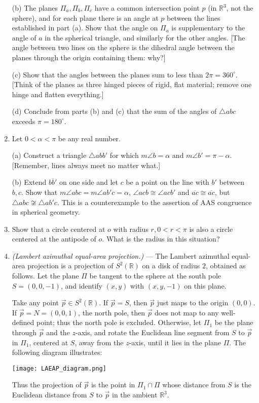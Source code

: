 \documentclass[leqno]{book}
\begin{document}
\begin{enumerate}
(b) The planes $\Pi_a,\Pi_b,\Pi_c$ have a common intersection point $p$ (in $\mathbb R^3$, not the sphere), and for each plane there is an angle at $p$ between the lines established in part (a).  Show that the angle on $\Pi_a$ is supplementary to the angle of $a$ in the spherical triangle, and similarly for the other angles.  [The angle between two lines on the sphere is the dihedral angle between the planes through the origin containing them: why?]

(c) Show that the angles between the planes sum to less than $2\pi=360^\circ$.  [Think of the planes as three hinged pieces of rigid, flat material; remove one hinge and flatten everything.]

(d) Conclude from parts (b) and (c) that the sum of the angles of $\triangle abc$ exceeds $\pi=180^\circ$.

\item Let $0<\alpha<\pi$ be any real number.

(a) Construct a triangle $\triangle abb'$ for which $m\angle b=\alpha$ and $m\angle b'=\pi-\alpha$.  [Remember, lines always meet no matter what.]

(b) Extend $\overline{bb'}$ on one side and let $c$ be a point on the line with $b'$ between $b,c$.  Show that $m\angle abc=m\angle ab'c=\alpha$, $\angle acb\cong\angle acb'$ and $\overline{ac}\cong\overline{ac}$, but $\triangle abc\not\cong\triangle ab'c$.  This is a counterexample to the assertion of AAS congruence in spherical geometry.

\item Show that a circle centered at $o$ with radius $r,0<r<\pi$ is also a circle centered at the antipode of $o$.  What is the radius in this situation?

\item\emph{(Lambert azimuthal equal-area projection.)} \---- The Lambert azimuthal equal-area projection is a projection of $S^2(\mathbb R)$ on a disk of radius $2$, obtained as follows.   Let the plane $\Pi$ be tangent to the sphere at the south pole $S=(0,0,-1)$, and identify $(x,y)$ with $(x,y,-1)$ on this plane.

Take any point $\vec p\in S^2(\mathbb R)$.  If $\vec p=S$, then $\vec p$ just maps to the origin $(0,0)$.  If $\vec p=N=(0,0,1)$, the north pole, then $\vec p$ does not map to any well-defined point; thus the north pole is excluded.  Otherwise, let $\Pi_1$ be the plane through $\vec p$ and the $z$-axis, and rotate the Euclidean line segment from $S$ to $\vec p$ in $\Pi_1$, centered at $S$, away from the $z$-axis, until it lies in the plane $\Pi$.  The following diagram illustrates:
\begin{center}
\texttt{[image: LAEAP\_diagram.png]}
\end{center}
Thus the projection of $\vec p$ is the point in $\Pi_1\cap\Pi$ whose distance from $S$ is the Euclidean distance from $S$ to $\vec p$ in the ambient $\mathbb R^3$.


\end{enumerate}
\end{document}
